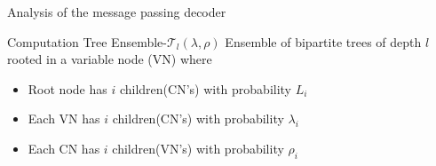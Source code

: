 \documentclass[10pt,xcolor=table]{beamer}
\begin{document}
\begin{frame}{Analysis of the message passing decoder}
\begin{block}{Computation Tree Ensemble-$\mathcal{T}_{l}(\lambda,\rho)$}
Ensemble of bipartite trees of depth $l$ rooted in a variable node (VN) where
\begin{itemize}
\item Root node has $i$ children(CN's) with probability $L_i$
\item Each VN has $i$ children(CN's) with probability $\lambda_i$
\item Each CN has $i$ children(VN's) with probability $\rho_i$
\end{itemize}
\end{block}
\end{frame}
\end{document}
